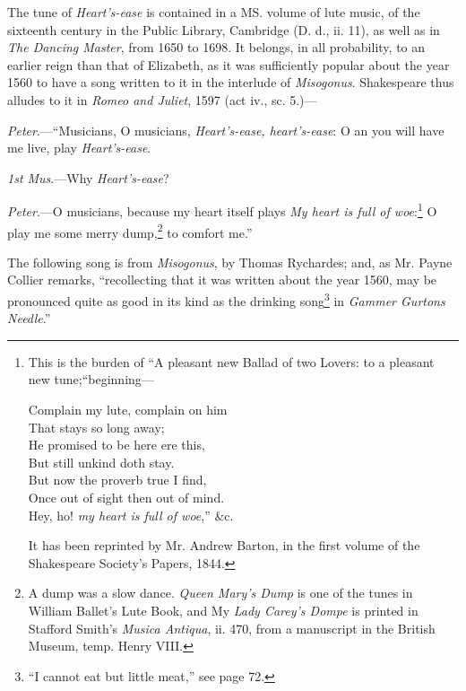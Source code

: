 \vspace{-1.5\baselineskip}


The tune of \textit{Heart’s-ease} is contained in a MS. volume of lute music, of the
sixteenth century in the Public Library, Cambridge (D. d., ii. 11), as well as in
\textit{The Dancing Master}, from 1650 to 1698. It belongs, in all probability, to an
earlier reign than that of Elizabeth, as it was sufficiently popular about the year
1560 to have a song written to it in the interlude of \textit{Misogonus}. Shakespeare
thus alludes to it in \textit{Romeo and Juliet}, 1597 (act iv., sc. 5.)—
\pagebreak

\textit{Peter}.—“Musicians, O musicians, \textit{Heart’s-ease, heart’s-ease}: O an you will have
me live, play \textit{Heart’s-ease}.

\textit{1st Mus}.—Why \textit{Heart’s-ease}?

\textit{Peter}.—O musicians, because my heart itself plays \textit{My heart is full of woe}:\footnote{\textit{}
This is the burden of “A pleasant new Ballad of two
Lovers: to a pleasant new tune;“beginning—

\settowidth{\versewidth}{Complain my lute, complain on him}
\begin{fnverse}
\begin{altverse}
Complain my lute, complain on him\\
That stays so long away;\\
He promised to be here ere this,\\
But still unkind doth stay.\\
But now the proverb true I find,\\
Once out of sight then out of mind.\\
Hey, ho! \textit{my heart is full of woe},” \&c.
\end{altverse}
\end{fnverse}
It has been reprinted by Mr. Andrew Barton, in the first
volume of the Shakespeare Society's Papers, 1844.}
O play me some merry dump,\footnote{\textit{}
A dump was a slow dance. \textit{Queen Mary's Dump} is
one of the tunes in William Ballet’s Lute Book, and My
\textit{Lady Carey's Dompe} is printed in Stafford Smith’s \textit{Musica
Antiqua}, ii. 470, from a manuscript in the British
Museum, temp. Henry VIII.}
 to comfort me.”

The following song is from \textit{Misogonus}, by Thomas Rychardes; and, as Mr.
Payne Collier remarks, “recollecting that it was written about the year 1560,
may be pronounced quite as good in its kind as the drinking song\footnote{\textit{}
“I cannot eat but little meat,” see page 72.}
 in \textit{Gammer
Gurtons Needle}.”

